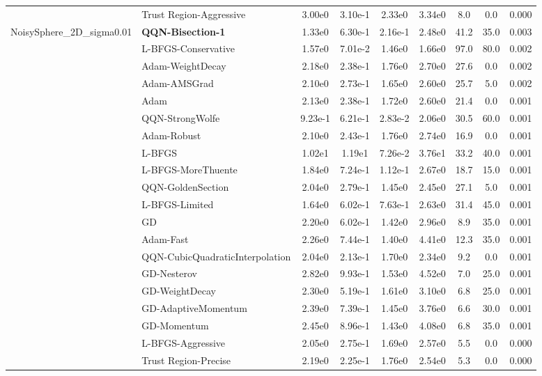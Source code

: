 \documentclass{article}
\begin{document}
\begin{longtable}{|l|l|c|c|c|c|c|c|c|}
\hline
 & Trust Region-Aggressive & 3.00e0 & 3.10e-1 & 2.33e0 & 3.34e0 & 8.0 & 0.0 & 0.000 \\
NoisySphere\_2D\_sigma0.01 & \textbf{QQN-Bisection-1} & 1.33e0 & 6.30e-1 & 2.16e-1 & 2.48e0 & 41.2 & 35.0 & 0.003 \\
\hline
 & L-BFGS-Conservative & 1.57e0 & 7.01e-2 & 1.46e0 & 1.66e0 & 97.0 & 80.0 & 0.002 \\
\hline
 & Adam-WeightDecay & 2.18e0 & 2.38e-1 & 1.76e0 & 2.70e0 & 27.6 & 0.0 & 0.002 \\
\hline
 & Adam-AMSGrad & 2.10e0 & 2.73e-1 & 1.65e0 & 2.60e0 & 25.7 & 5.0 & 0.002 \\
\hline
 & Adam & 2.13e0 & 2.38e-1 & 1.72e0 & 2.60e0 & 21.4 & 0.0 & 0.001 \\
\hline
 & QQN-StrongWolfe & 9.23e-1 & 6.21e-1 & 2.83e-2 & 2.06e0 & 30.5 & 60.0 & 0.001 \\
\hline
 & Adam-Robust & 2.10e0 & 2.43e-1 & 1.76e0 & 2.74e0 & 16.9 & 0.0 & 0.001 \\
\hline
 & L-BFGS & 1.02e1 & 1.19e1 & 7.26e-2 & 3.76e1 & 33.2 & 40.0 & 0.001 \\
\hline
 & L-BFGS-MoreThuente & 1.84e0 & 7.24e-1 & 1.12e-1 & 2.67e0 & 18.7 & 15.0 & 0.001 \\
\hline
 & QQN-GoldenSection & 2.04e0 & 2.79e-1 & 1.45e0 & 2.45e0 & 27.1 & 5.0 & 0.001 \\
\hline
 & L-BFGS-Limited & 1.64e0 & 6.02e-1 & 7.63e-1 & 2.63e0 & 31.4 & 45.0 & 0.001 \\
\hline
 & GD & 2.20e0 & 6.02e-1 & 1.42e0 & 2.96e0 & 8.9 & 35.0 & 0.001 \\
\hline
 & Adam-Fast & 2.26e0 & 7.44e-1 & 1.40e0 & 4.41e0 & 12.3 & 35.0 & 0.001 \\
\hline
 & QQN-CubicQuadraticInterpolation & 2.04e0 & 2.13e-1 & 1.70e0 & 2.34e0 & 9.2 & 0.0 & 0.001 \\
\hline
 & GD-Nesterov & 2.82e0 & 9.93e-1 & 1.53e0 & 4.52e0 & 7.0 & 25.0 & 0.001 \\
\hline
 & GD-WeightDecay & 2.30e0 & 5.19e-1 & 1.61e0 & 3.10e0 & 6.8 & 25.0 & 0.001 \\
\hline
 & GD-AdaptiveMomentum & 2.39e0 & 7.39e-1 & 1.45e0 & 3.76e0 & 6.6 & 30.0 & 0.001 \\
\hline
 & GD-Momentum & 2.45e0 & 8.96e-1 & 1.43e0 & 4.08e0 & 6.8 & 35.0 & 0.001 \\
\hline
 & L-BFGS-Aggressive & 2.05e0 & 2.75e-1 & 1.69e0 & 2.57e0 & 5.5 & 0.0 & 0.000 \\
\hline
 & Trust Region-Precise & 2.19e0 & 2.25e-1 & 1.76e0 & 2.54e0 & 5.3 & 0.0 & 0.000 \\

\end{longtable}
\end{document}
